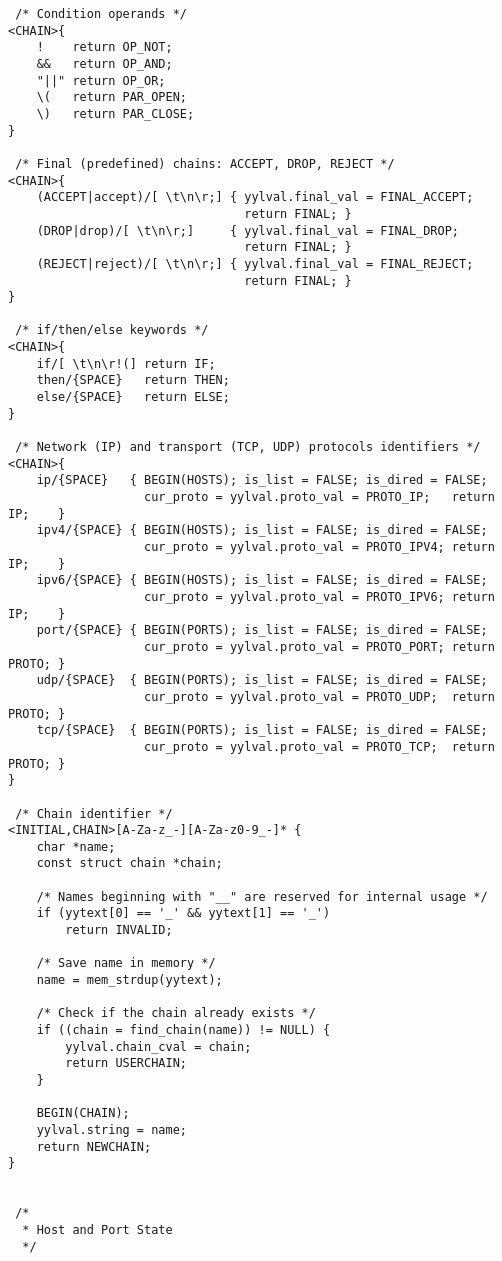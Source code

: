\documentclass[a4paper,landscape,twocolumn,11pt]{article}
\begin{document}
{\begin{verbatim}
 /* Condition operands */
<CHAIN>{
    !    return OP_NOT;
    &&   return OP_AND;
    "||" return OP_OR;
    \(   return PAR_OPEN;
    \)   return PAR_CLOSE;
}

 /* Final (predefined) chains: ACCEPT, DROP, REJECT */
<CHAIN>{
    (ACCEPT|accept)/[ \t\n\r;] { yylval.final_val = FINAL_ACCEPT;
                                 return FINAL; }
    (DROP|drop)/[ \t\n\r;]     { yylval.final_val = FINAL_DROP;
                                 return FINAL; }
    (REJECT|reject)/[ \t\n\r;] { yylval.final_val = FINAL_REJECT;
                                 return FINAL; }
}

 /* if/then/else keywords */
<CHAIN>{
    if/[ \t\n\r!(] return IF;
    then/{SPACE}   return THEN;
    else/{SPACE}   return ELSE;
}

 /* Network (IP) and transport (TCP, UDP) protocols identifiers */
<CHAIN>{
    ip/{SPACE}   { BEGIN(HOSTS); is_list = FALSE; is_dired = FALSE;
                   cur_proto = yylval.proto_val = PROTO_IP;   return IP;    }
    ipv4/{SPACE} { BEGIN(HOSTS); is_list = FALSE; is_dired = FALSE;
                   cur_proto = yylval.proto_val = PROTO_IPV4; return IP;    }
    ipv6/{SPACE} { BEGIN(HOSTS); is_list = FALSE; is_dired = FALSE;
                   cur_proto = yylval.proto_val = PROTO_IPV6; return IP;    }
    port/{SPACE} { BEGIN(PORTS); is_list = FALSE; is_dired = FALSE;
                   cur_proto = yylval.proto_val = PROTO_PORT; return PROTO; }
    udp/{SPACE}  { BEGIN(PORTS); is_list = FALSE; is_dired = FALSE;
                   cur_proto = yylval.proto_val = PROTO_UDP;  return PROTO; }
    tcp/{SPACE}  { BEGIN(PORTS); is_list = FALSE; is_dired = FALSE;
                   cur_proto = yylval.proto_val = PROTO_TCP;  return PROTO; }
}

 /* Chain identifier */
<INITIAL,CHAIN>[A-Za-z_-][A-Za-z0-9_-]* {
    char *name;
    const struct chain *chain;

    /* Names beginning with "__" are reserved for internal usage */
    if (yytext[0] == '_' && yytext[1] == '_')
        return INVALID;

    /* Save name in memory */
    name = mem_strdup(yytext);

    /* Check if the chain already exists */
    if ((chain = find_chain(name)) != NULL) {
        yylval.chain_cval = chain;
        return USERCHAIN;
    }

    BEGIN(CHAIN);
    yylval.string = name;
    return NEWCHAIN;
}


 /*
  * Host and Port State
  */


\end{verbatim}}
\end{document}
